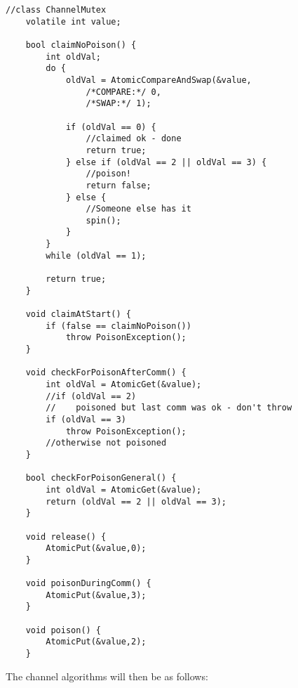 \documentclass{article}
\begin{document}
{\small\begin{verbatim}
//class ChannelMutex
    volatile int value;
    
    bool claimNoPoison() {
        int oldVal;
        do {
            oldVal = AtomicCompareAndSwap(&value,
                /*COMPARE:*/ 0,
                /*SWAP:*/ 1);
            
            if (oldVal == 0) {
                //claimed ok - done
                return true;
            } else if (oldVal == 2 || oldVal == 3) {
                //poison!
                return false;
            } else {
                //Someone else has it
                spin();
            }            
        }
        while (oldVal == 1);
        
        return true;
    }
    
    void claimAtStart() {
        if (false == claimNoPoison())
            throw PoisonException();
    }        
    
    void checkForPoisonAfterComm() {
        int oldVal = AtomicGet(&value);
        //if (oldVal == 2)
        //    poisoned but last comm was ok - don't throw
        if (oldVal == 3)
            throw PoisonException();
        //otherwise not poisoned
    }
    
    bool checkForPoisonGeneral() {
        int oldVal = AtomicGet(&value);
        return (oldVal == 2 || oldVal == 3);
    }
    
    void release() {
        AtomicPut(&value,0);
    }
    
    void poisonDuringComm() {
        AtomicPut(&value,3);
    }
    
    void poison() {
        AtomicPut(&value,2);
    }
\end{verbatim}}

The channel algorithms will then be as follows:
\end{document}
